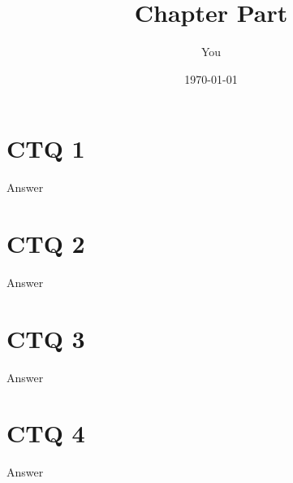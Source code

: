 \documentclass{article}
\title{Chapter Part}
\author{You}
\date{\today}
\begin{document}
\maketitle
\section{CTQ 1}
	\Large{Answer}
\section{CTQ 2}
	\Large{Answer}
\section{CTQ 3}
	\Large{Answer}
\section{CTQ 4}
	\Large{Answer}
\end{document}
